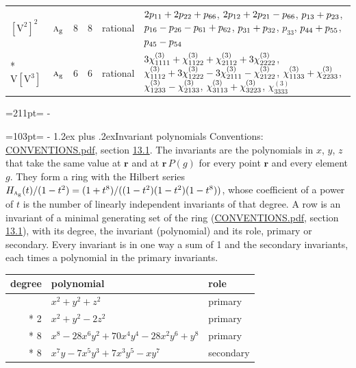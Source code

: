 \documentclass[10pt,a4paper]{article}
\makeatletter
\renewcommand\section{\@startsection{section}{1}{\z@}{-3ex plus -1ex minus -.2ex}%
  {1.2ex plus .2ex}{\normalfont\large\sffamily\bfseries\color{parttitle}}}
\newcommand{\needspace}[1]{\par\penalty-100\begingroup\dimen0=#1\relax\dimen2=\pagegoal
  \advance\dimen2-\pagetotal\ifdim\dimen0>\dimen2\relax\ifdim\dimen2>0pt\vfil\break\fi\fi
  \endgroup}
\numberwithin{equation}{section}
\newcommand{\irr}[1]{\text{\normalfont\scshape #1}}
\newcommand{\ptag}[1]{\mathrm{#1}}
\newcommand{\pointr}{\mathbf{r}}
\newcommand{\jahn}[1]{\mathrm{#1}}
\newlength{\fillwidth}\newlength{\cellwidth}\newlength{\colwidth}
\newcommand{\signbreak}{\penalty100\relax}
\makeatother
\begin{document}
{\begin{longtable}{@{}llrrl>{\RaggedRight\arraybackslash}p{\fillwidth}@{}}
$\jahn{[V^{2}]^{2}}$ & $\irr{a}_{\ptag{g}}$ & 8 & 8 & rational & $2p_{11} +\signbreak 2p_{22} +\signbreak p_{66}$, $2p_{12} +\signbreak 2p_{21} -\signbreak p_{66}$, $p_{13} +\signbreak p_{23}$, $p_{16} -\signbreak p_{26} -\signbreak p_{61} +\signbreak p_{62}$, $p_{31} +\signbreak p_{32}$, $p_{33}$, $p_{44} +\signbreak p_{55}$, $p_{45} -\signbreak p_{54}$\\*
$\jahn{V[V^{3}]}$ & $\irr{a}_{\ptag{g}}$ & 6 & 6 & rational & $3\chi^{(3)}_{1111} +\signbreak \chi^{(3)}_{1122} +\signbreak \chi^{(3)}_{2112} +\signbreak 3\chi^{(3)}_{2222}$, $\chi^{(3)}_{1112} +\signbreak 3\chi^{(3)}_{1222} -\signbreak 3\chi^{(3)}_{2111} -\signbreak \chi^{(3)}_{2122}$, $\chi^{(3)}_{1133} +\signbreak \chi^{(3)}_{2233}$, $\chi^{(3)}_{1233} -\signbreak \chi^{(3)}_{2133}$, $\chi^{(3)}_{3113} +\signbreak \chi^{(3)}_{3223}$, $\chi^{(3)}_{3333}$\\
\bottomrule\end{longtable}}
\needspace{211pt}
\needspace{103pt}
\section{Invariant polynomials}\label{s:invariant_polynomials}
Conventions: \href{../../CONVENTIONS.pdf}{CONVENTIONS.pdf}, section \href{../../CONVENTIONS.pdf\#conv.13.1}{13.1}.
The invariants are the polynomials in $x$, $y$, $z$ that take the same value at $\pointr$ and at $\pointr\,P(g)$ for every point $\pointr$ and every element $g$. They form a ring with the Hilbert series $H_{\irr{a}_{\ptag{g}}}(t)/(1-t^{2}) = (1 + t^{8})/((1-t^{2})(1-t^{2})(1-t^{8}))$, whose coefficient of a power of $t$ is the number of linearly independent invariants of that degree. \label{n:head.degree}\label{n:head.role}A row is an invariant of a minimal generating set of the ring (\href{../../CONVENTIONS.pdf}{CONVENTIONS.pdf}, section \href{../../CONVENTIONS.pdf\#conv.13.1}{13.1}), with its degree, the invariant (polynomial) and its role, primary or secondary. Every invariant is in one way a sum of 1 and the secondary invariants, each times a polynomial in the primary invariants.
{\small\begin{longtable}{@{}rll@{}}\toprule
degree & polynomial & role\\\midrule\endhead
\bottomrule\endfoot\endlastfoot
2 & $x^{2} + y^{2} + z^{2}$ & primary\\*
2 & $x^{2} + y^{2} - 2z^{2}$ & primary\\*
8 & $x^{8} - 28x^{6}y^{2} + 70x^{4}y^{4} - 28x^{2}y^{6} + y^{8}$ & primary\\*
8 & $x^{7}y - 7x^{5}y^{3} + 7x^{3}y^{5} - xy^{7}$ & secondary\\
\bottomrule\end{longtable}}
\end{document}
